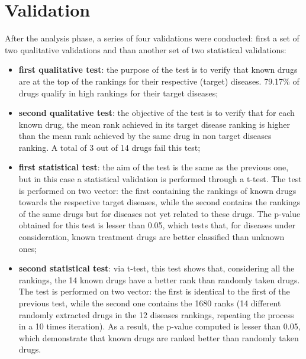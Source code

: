 

\section{Validation}
After the analysis phase, a series of four validations were conducted: first a set of two qualitative validations and than another set of two statistical validations:
\begin{itemize}
    \item \textbf{first qualitative test}: the purpose of the test is to verify that known drugs are at the top of the rankings for their respective (target) diseases. 79.17\% of drugs qualify in high rankings for their target diseases;
    \item \textbf{second qualitative test}: the objective of the test is to verify that for each known drug, the mean rank achieved in its target disease ranking is higher than the mean rank achieved by the same drug in non target diseases ranking. A total of 3 out of 14 drugs fail this test; 
    \item \textbf{first statistical test}: the aim of the test is the same as the previous one, but in this case a statistical validation is performed through a t-test.
    The test is performed on two vector: the first containing the rankings of known drugs towards the respective target diseases, while the second contains the rankings of the same drugs but for diseases not yet related to these drugs.
    The p-value obtained for this test is lesser than 0.05, which tests that, for diseases under consideration, known treatment drugs are better classified than unknown ones;
    \item \textbf{second statistical test}: via t-test, this test shows that, considering all the rankings, the 14 known drugs have a better rank than randomly taken drugs.
    The test is performed on two vector: the first is identical to the first of the previous test, while the second one contains the 1680 ranks (14 different randomly extracted drugs in the 12 diseases rankings, repeating the process in a 10 times iteration).
    As a result, the p-value computed is lesser than 0.05, which demonstrate that known drugs are ranked better than randomly taken drugs.
\end{itemize}

